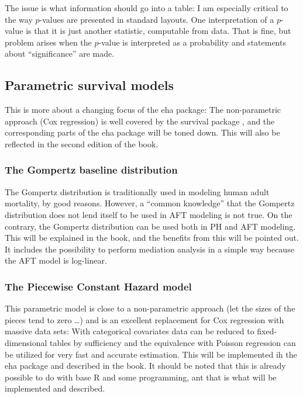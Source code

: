 \documentclass[a4paper,11pt]{article}
\begin{document}
The issue is what information should go into a table: I am especially
critical to the way $p$-values are presented in standard layouts.  One
interpretation of a $p$-value is that it is just another statistic,
computable from data. That is fine, but problem arises when the $p$-value is
interpreted as a probability and statements about ``significance'' are made.

\subsection{Parametric survival models}

This is more about a changing focus of the eha package: The non-parametric
approach (Cox regression) is well covered by the survival package
\citep{survival}, and the corresponding parts of the eha package will be
toned down. This will also be reflected in the second edition of the book. 

\subsubsection{The Gompertz baseline distribution}

The Gompertz distribution is traditionally used in modeling human adult
mortality, by good reasons. However, a ``common knowledge'' that the
Gompertz distribution does not lend itself to be used in AFT modeling is
not true. On the contrary, the Gompertz distribution can be used both in PH
and AFT modeling. This will be explained in the book, and the benefits from
this will be pointed out. It includes the possibility to perform mediation
analysis in a simple way because the AFT model is log-linear.


\subsubsection{The Piecewise Constant Hazard model}

This parametric model is close to a non-parametric approach (let the sizes
of the pieces tend to zero \ldots) and is an excellent replacement for Cox
regression with massive data sets: With categorical covariates data can be
reduced to fixed-dimensional tables by sufficiency and the equivalence
with Poisson regression can be utilized for very fast and accurate
estimation. This will be implemented ih the eha package and described in
the book. It should be noted that this is already possible to do with base R
and some programming, ant that is what will be implemented and described.   
\end{document}
